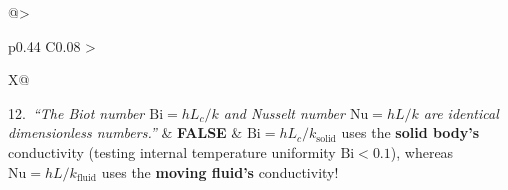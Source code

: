 \begin{table}[h!]
\begin{tabularx}{\linewidth}{@{}>{\raggedright\arraybackslash}p{0.44\linewidth} C{0.08\linewidth} >{\raggedright\arraybackslash}X@{}}
12.~\emph{``The Biot number $\mathrm{Bi} = h L_c / k$ and Nusselt number $\mathrm{Nu} = h L / k$ are identical dimensionless numbers.''} & \textbf{FALSE} & $\mathrm{Bi} = h L_c / k_{\mathrm{solid}}$ uses the \textbf{solid body's} conductivity (testing internal temperature uniformity $\mathrm{Bi}<0.1$), whereas $\mathrm{Nu} = h L / k_{\mathrm{fluid}}$ uses the \textbf{moving fluid's} conductivity! \\
\bottomrule
\end{tabularx}
\end{table}

